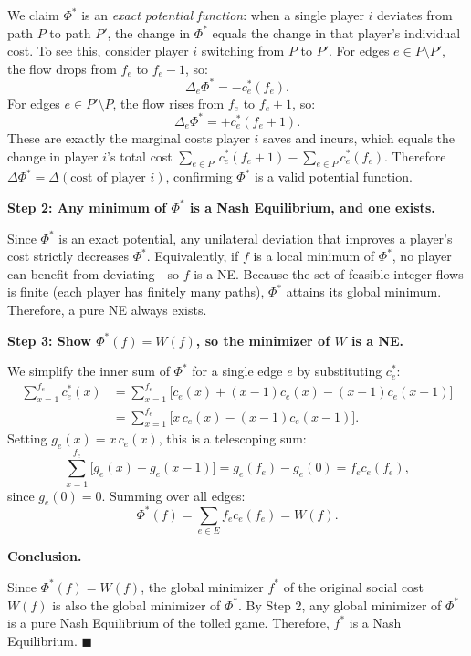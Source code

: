 \documentclass{article}
\begin{document}
We claim $\Phi^*$ is an \emph{exact potential function}: when a single player $i$ deviates from path $P$ to path $P'$, the change in $\Phi^*$ equals the change in that player's individual cost. To see this, consider player $i$ switching from $P$ to $P'$. For edges $e \in P \setminus P'$, the flow drops from $f_e$ to $f_e - 1$, so:
$$
\Delta_{e}\Phi^* = -c^*_e(f_e).
$$
For edges $e \in P' \setminus P$, the flow rises from $f_e$ to $f_e + 1$, so:
$$
\Delta_{e}\Phi^* = +c^*_e(f_e + 1).
$$
These are exactly the marginal costs player $i$ saves and incurs, which equals the change in player $i$'s total cost $\sum_{e \in P'} c^*_e(f_e+1) - \sum_{e \in P} c^*_e(f_e)$. Therefore $\Delta\Phi^* = \Delta(\text{cost of player }i)$, confirming $\Phi^*$ is a valid potential function.

\medskip
\noindent\textbf{Step 2: Any minimum of $\Phi^*$ is a Nash Equilibrium, and one exists.}

Since $\Phi^*$ is an exact potential, any unilateral deviation that improves a player's cost strictly decreases $\Phi^*$. Equivalently, if $f$ is a local minimum of $\Phi^*$, no player can benefit from deviating---so $f$ is a NE. Because the set of feasible integer flows is finite (each player has finitely many paths), $\Phi^*$ attains its global minimum. Therefore, a pure NE always exists.

\medskip
\noindent\textbf{Step 3: Show $\Phi^*(f) = W(f)$, so the minimizer of $W$ is a NE.}

We simplify the inner sum of $\Phi^*$ for a single edge $e$ by substituting $c^*_e$:
\begin{align*}
\sum_{x=1}^{f_e} c^*_e(x)
  &= \sum_{x=1}^{f_e} \bigl[c_e(x) + (x-1)c_e(x) - (x-1)c_e(x-1)\bigr] \\
  &= \sum_{x=1}^{f_e} \bigl[x\, c_e(x) - (x-1)c_e(x-1)\bigr].
\end{align*}
Setting $g_e(x) = x\,c_e(x)$, this is a telescoping sum:
$$
\sum_{x=1}^{f_e} \bigl[g_e(x) - g_e(x-1)\bigr] = g_e(f_e) - g_e(0) = f_e c_e(f_e),
$$
since $g_e(0)=0$. Summing over all edges:
$$
\Phi^*(f) = \sum_{e \in E} f_e c_e(f_e) = W(f).
$$

\medskip
\noindent\textbf{Conclusion.}

Since $\Phi^*(f) = W(f)$, the global minimizer $f^*$ of the original social cost $W(f)$ is also the global minimizer of $\Phi^*$. By Step 2, any global minimizer of $\Phi^*$ is a pure Nash Equilibrium of the tolled game. Therefore, $f^*$ is a Nash Equilibrium. $\blacksquare$
\end{document}
